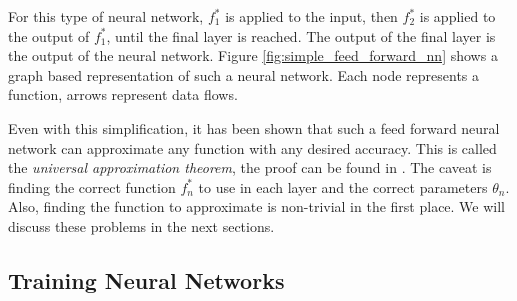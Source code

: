 For this type of neural network, $f^*_1$ is applied to the input, then $f^*_2$ is applied to the output of $f^*_1$, until the final layer is reached. The output of the final layer is the output of the neural network. Figure \ref{fig:simple_feed_forward_nn} shows a graph based representation of such a neural network. Each node represents a function, arrows represent data flows. 

\begin{minipage}{\linewidth}
	\label{fig:simple_feed_forward_nn}
	\hspace{1cm}
\end{minipage}


Even with this simplification, it has been shown that such a feed forward neural network can approximate any function with any desired accuracy. This is called the \textit{universal approximation theorem}, the proof can be found in \cite{hornik1989multilayer}. The caveat is finding the correct function $f^*_n$ to use in each layer and the correct parameters $\theta_n$. Also, finding the function to approximate is non-trivial in the first place. We will discuss these problems in the next sections. 

\subsection{Training Neural Networks}

